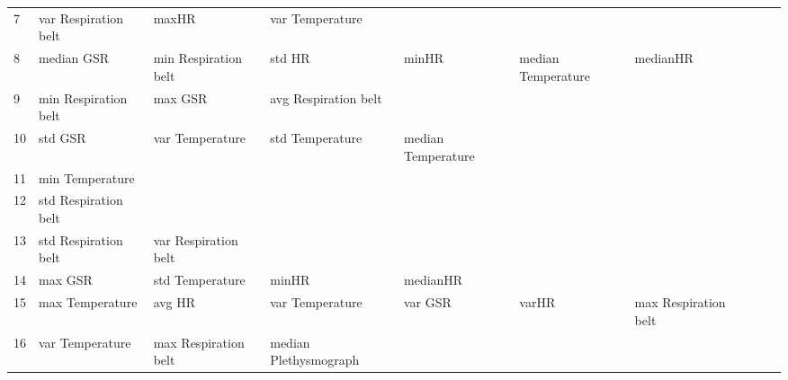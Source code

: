 \begin{landscape}
\begin{table}[]
\begin{tabular}{l|llllllll}
7        & var Respiration belt    & maxHR                 & var Temperature         &                         &                         &                       &                      &          &                      &        \\
8        & median GSR              & min Respiration belt  & std HR                  & minHR                   & median Temperature      & medianHR              &                      &          &                      &        \\
9        & min Respiration belt    & max GSR               & avg Respiration belt    &                         &                         &                       &                      &          &                      &        \\
10       & std GSR                 & var Temperature       & std Temperature         & median Temperature      &                         &                       &                      &          &                      &        \\
11       & min Temperature         &                       &                         &                         &                         &                       &                      &          &                      &        \\
12       & std Respiration belt    &                       &                         &                         &                         &                       &                      &          &                      &        \\
13       & std Respiration belt    & var Respiration belt  &                         &                         &                         &                       &                      &          &                      &        \\
14       & max GSR                 & std Temperature       & minHR                   & medianHR                &                         &                       &                      &          &                      &        \\
15       & max Temperature         & avg HR                & var Temperature         & var GSR                 & varHR                   & max Respiration belt  &                      &          &                      &        \\
16       & var Temperature         & max Respiration belt  & median Plethysmograph   &                         &                         &                       &                      &          &                      &        \\

\end{tabular}
\end{table}
\end{landscape}
